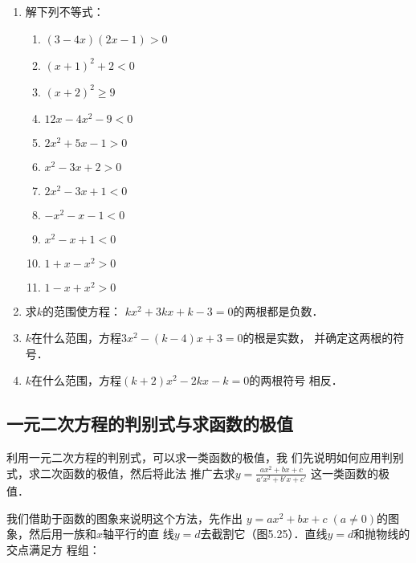 \begin{ex}
\begin{enumerate}
    \item 解下列不等式：
\begin{multicols}{2}
\begin{enumerate}
    \item $(3-4x)(2x-1)>0$
    \item $(x+1)^2+2<0$
    \item $(x+2)^2\ge 9$
    \item $12x-4x^2-9<0$
    \item $2x^2+5x-1>0$
    \item $x^2-3x+2>0$
    \item $2x^2-3x+1<0$
    \item $-x^2-x-1<0$
    \item $x^2-x+1<0$
    \item $1+x-x^2>0$
    \item $1-x+x^2>0$
\end{enumerate}
\end{multicols}

\item 求$k$的范围使方程：
$kx^2+3kx+k-3=0$的两根都是负数．
\item $k$在什么范围，方程$3x^2-(k-4)x+3=0$的根是实数，
并确定这两根的符号．
\item $k$在什么范围，方程$(k+2)x^2-2kx-k=0$的两根符号
相反．
\end{enumerate}    
\end{ex}

\subsection{一元二次方程的判别式与求函数的极值}
利用一元二次方程的判别式，可以求一类函数的极值，我
们先说明如何应用判别式，求二次函数的极值，然后将此法
推广去求$y=\frac{ax^2+bx+c}{a'x^2+b'x+c'}$
这一类函数的极值．

我们借助于函数的图象来说明这个方法，先作出
$y=ax^2+bx+c\; (a\ne 0)$的图象，然后用一族和$x$轴平行的直
线$y=d$去截割它（图5.25）．直线$y=d$和抛物线的交点满足方
程组：

